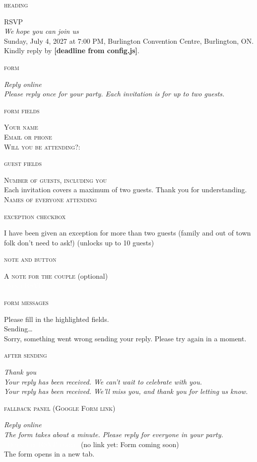 \documentclass[11pt]{article}
\newcommand{\lbl}[1]{{\footnotesize\color{gold}\textsc{#1}}\par}
\newcommand{\rsvphead}[4]{\lbl{heading}\textsc{\small #1}\\ {\LARGE\itshape #2}\\ #3\\ #4 \textbf{[deadline from config.js]}.\par\medskip}
\newcommand{\rsvpform}[2]{\lbl{form}{\large\itshape #1}\\ {\color{muted}\itshape #2}\par\medskip}
\newcommand{\formfields}[5]{\lbl{form fields}\textsc{\small #1}\\ \textsc{\small #2}\\ \textsc{\small #3}: \fbox{\textsc{\small #4}} \fbox{\textsc{\small #5}}\par\medskip}
\newcommand{\formexception}[2]{\lbl{exception checkbox}[\,\,] #1 {\small\color{muted}(unlocks up to #2 guests)}\par\medskip}
\newcommand{\formguests}[3]{\lbl{guest fields}\textsc{\small #1}\\ {\small\color{muted}#2}\\ \textsc{\small #3}\par\medskip}
\newcommand{\formnote}[3]{\lbl{note and button}\textsc{\small #1} {\small\color{muted}#2}\\ \colorbox{lapis}{\textcolor{white}{\textsc{\ #3\ }}}\par\medskip}
\newcommand{\formmessages}[3]{\lbl{form messages}{\small #1}\\ {\small #2}\\ {\small #3}\par\medskip}
\newcommand{\thankyou}[3]{\lbl{after sending}{\large\itshape #1}\\ {\color{muted}\itshape #2}\\ {\color{muted}\itshape #3}\par\medskip}
\newcommand{\rsvpfallback}[5]{\lbl{fallback panel (Google Form link)}{\large\itshape #1}\\ {\color{muted}\itshape #2}\\ \colorbox{lapis}{\textcolor{white}{\textsc{\ #3\ }}} {\color{muted}\small(no link yet: #4)}\\ {\small #5}\par\medskip}
\begin{document}
\rsvphead{RSVP}{We hope you can join us}{Sunday, July 4, 2027 at 7:00 PM, Burlington Convention Centre, Burlington, ON.}{Kindly reply by}
\rsvpform{Reply online}{Please reply once for your party. Each invitation is for up to two guests.}
\formfields{Your name}{Email or phone}{Will you be attending?}{Yes!}{No :$($}
\formguests{Number of guests, including you}{Each invitation covers a maximum of two guests. Thank you for understanding.}{Names of everyone attending}
\formexception{I have been given an exception for more than two guests (family and out of town folk don't need to ask!)}{10}
\formnote{A note for the couple}{(optional)}{Send RSVP}
\formmessages{Please fill in the highlighted fields.}{Sending…}{Sorry, something went wrong sending your reply. Please try again in a moment.}
\thankyou{Thank you}{Your reply has been received. We can't wait to celebrate with you.}{Your reply has been received. We'll miss you, and thank you for letting us know.}
\rsvpfallback{Reply online}{The form takes about a minute. Please reply for everyone in your party.}{Open the RSVP form}{Form coming soon}{The form opens in a new tab.}
\end{document}
